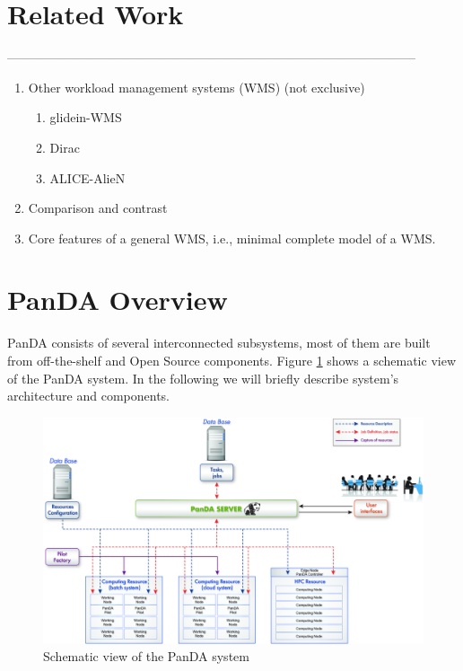 \documentclass[10pt, conference, compsocconf]{IEEEtran}
\begin{document}
\section{Related Work}
\label{sec:related}

--------------------------------------------------------------------------------------------------
\begin{enumerate}
  \item Other workload management systems (WMS) (not exclusive)
  \begin{enumerate}
    \item glidein-WMS
    \item Dirac
    \item ALICE-AlieN
  \end{enumerate}
  \item Comparison and contrast
  \item Core features of a general WMS, i.e., minimal complete model of a WMS.
\end{enumerate}

\section{PanDA Overview}\label{sec:panda_overview}
PanDA consists of several interconnected subsystems, most of them are built from off-the-shelf and Open Source components. Figure \ref{fig:architecture} shows a schematic view of the PanDA system.
In the following we will briefly describe system’s architecture and components.

\begin{figure}
\begin{center}
\includegraphics[width=\columnwidth]{figures/PandaArch.jpg}
\caption{Schematic view of the PanDA system\label{fig:architecture}}
\end{center}
\end{figure}
\end{document}
